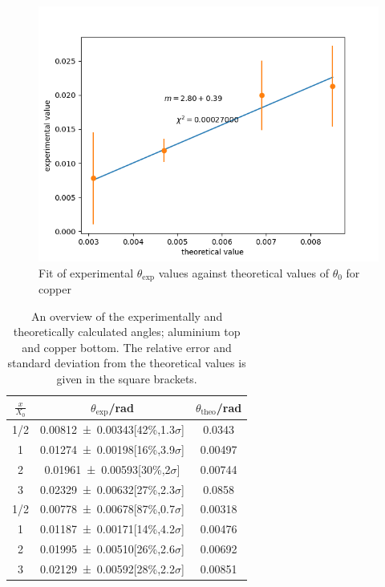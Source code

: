 \documentclass[t,9pt]{beamer}
\begin{document}
        \begin{frame}
                \vfill
                \begin{figure}
                        \centering
                        \includegraphics[width=.8\textwidth]{../src/elsa/finished_plots/Copper.png}
                        \caption{Fit of experimental $\theta_{\text{exp}}$ values against theoretical values of $\theta_{0}$ for copper}
                \end{figure}
        \end{frame}

        \begin{frame}
                \vfill
                \begin{table}
                        \begin{tabular}{ccc}
                                \toprule
                                $\tfrac{x}{X_0}$ & $\theta _\text{exp}$/rad & $\theta _\text{theo}$/rad \\
                                \midrule
                                1/2 & \num{.00812+-.00343}[42\%,1.3$\sigma$] & 0.0343\\
                                1 & \num{.01274+-.00198}[16\%,3.9$\sigma$] & 0.00497\\
                                2 & \num{.01961+-.00593}[30\%,2$\sigma$] & 0.00744\\
                                3 & \num{.02329+-.00632}[27\%,2.3$\sigma$] & 0.0858\\
                                \midrule
                                1/2 & \num{.00778+-.00678}[87\%,0.7$\sigma$] & 0.00318\\
                                1 & \num{.01187+-.00171}[14\%,4.2$\sigma$] & 0.00476\\
                                2 & \num{.01995+-.00510}[26\%,2.6$\sigma$] & 0.00692\\
                                3 & \num{.02129+-.00592}[28\%,2.2$\sigma$] & 0.00851\\
                                \bottomrule
                        \end{tabular}
                        \caption{An overview of the experimentally and theoretically calculated angles; aluminium top and copper bottom. 
                        The relative error and standard deviation from the theoretical values is given in the square brackets.}
                \end{table}
        \end{frame}
\end{document}
